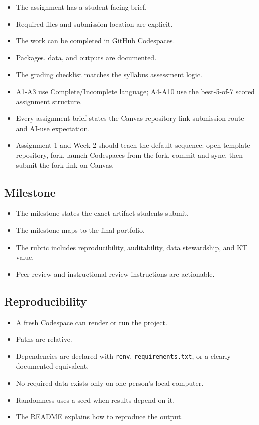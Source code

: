 \documentclass[
  letterpaper,
  DIV=11,
  numbers=noendperiod,
  oneside]{scrreprt}
\providecommand{\tightlist}{%
  \setlength{\itemsep}{0pt}\setlength{\parskip}{0pt}}
\begin{document}
\begin{itemize}
\tightlist
\item
  The assignment has a student-facing brief.
\item
  Required files and submission location are explicit.
\item
  The work can be completed in GitHub Codespaces.
\item
  Packages, data, and outputs are documented.
\item
  The grading checklist matches the syllabus assessment logic.
\item
  A1-A3 use Complete/Incomplete language; A4-A10 use the best-5-of-7
  scored assignment structure.
\item
  Every assignment brief states the Canvas repository-link submission
  route and AI-use expectation.
\item
  Assignment 1 and Week 2 should teach the default sequence: open
  template repository, fork, launch Codespaces from the fork, commit and
  sync, then submit the fork link on Canvas.
\end{itemize}

\subsection*{Milestone}\label{milestone}

\begin{itemize}
\tightlist
\item
  The milestone states the exact artifact students submit.
\item
  The milestone maps to the final portfolio.
\item
  The rubric includes reproducibility, auditability, data stewardship,
  and KT value.
\item
  Peer review and instructional review instructions are actionable.
\end{itemize}

\subsection*{Reproducibility}\label{reproducibility}

\begin{itemize}
\tightlist
\item
  A fresh Codespace can render or run the project.
\item
  Paths are relative.
\item
  Dependencies are declared with \texttt{renv},
  \texttt{requirements.txt}, or a clearly documented equivalent.
\item
  No required data exists only on one person's local computer.
\item
  Randomness uses a seed when results depend on it.
\item
  The README explains how to reproduce the output.
\end{itemize}
\end{document}
